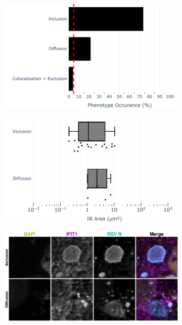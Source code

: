 \begin{figure}
    \begin{subfigure}{0.5\textwidth}
        \caption{}
        \includegraphics[width=1\linewidth]{09. Chapter 4/Figs/04. Overexpression/01. IFIT1/01. bar_i1_hrsv.pdf} 
    \end{subfigure}
    \begin{subfigure}{0.5\textwidth}
        \caption{}
        \includegraphics[width=1\linewidth]{09. Chapter 4/Figs/04. Overexpression/01. IFIT1/02. box_i1_hrsv.pdf}
    \end{subfigure}
    \begin{subfigure}{1\textwidth}
        \centering
        \caption{}
        \includegraphics[width=1\linewidth]{09. Chapter 4/Figs/04. Overexpression/01. IFIT1/03. i1-hrsv.pdf}

\end{subfigure}
\end{figure}
